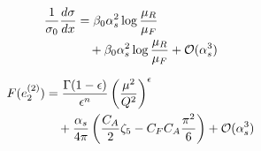 \begin{align}
  \frac{1}{\sigma_0} \frac{d\sigma}{dx} &= \beta_0 \alpha_s^2 \log\frac{\mu_R}{\mu_F} \nonumber \\
  &\quad + \beta_0 \alpha_s^2 \log\frac{\mu_R}{\mu_F} + \mathcal{O}(\alpha_s^3) \label{eq:4}
\end{align}

\begin{align}
  F(e_2^{(2)}) &= \frac{\Gamma(1-\epsilon)}{\epsilon^{n}} \left(\frac{\mu^2}{Q^2}\right)^{\epsilon} \nonumber \\
  &\quad + \frac{\alpha_s}{4\pi} \left( \frac{C_A}{2} \zeta_{5} - C_F C_A \frac{\pi^2}{6} \right) + \mathcal{O}(\alpha_s^3) \label{eq:5}
\end{align}

